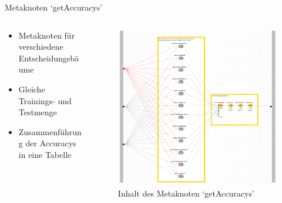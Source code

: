 \documentclass[
	handout,
  	aspectratio=169
]{beamer}
\begin{document}
			\begin{frame}{Metaknoten `getAccuracys'}		
				\begin{columns}[T]
   				\begin{column}{.5\textwidth}
					\begin{itemize}
						\item Metaknoten für verschiedene Entscheidungsbäume 
						\item Gleiche Trainings- und Testmenge
						\item Zusammenführung der Accuracys in eine Tabelle
					\end{itemize}
    				\end{column}    				
    				\begin{column}{.5\textwidth}
					\begin{figure}[h]
						\includegraphics[scale=0.17]{../pictures/trees-workflow-getAccuracys.png}
						\caption{Inhalt des Metaknoten `getAccuracys'}			
					\end{figure}					
    				\end{column}
  				\end{columns}
			\end{frame}
			
\end{document}
